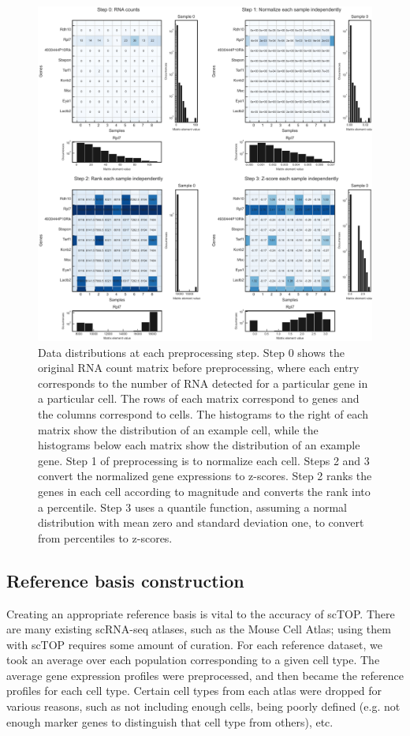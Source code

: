 \documentclass[aps,superscriptaddress, notitlepage,longbibliography]{revtex4-1}
\begin{document}
\begin{figure}
	\centering
		\includegraphics[scale=0.6]{figs/fig1a supplement.pdf}
	\caption{Data distributions at each preprocessing step. Step 0 shows the original RNA count matrix before preprocessing, where each entry corresponds to the number of RNA detected for a particular gene in a particular cell. The rows of each matrix correspond to genes and the columns correspond to cells. The histograms to the right of each matrix show the distribution of an example cell, while the histograms below each matrix show the distribution of an example gene. Step 1 of preprocessing is to normalize each cell. Steps 2 and 3 convert the normalized gene expressions to z-scores. Step 2 ranks the genes in each cell according to magnitude and converts the rank into a percentile. Step 3 uses a quantile function, assuming a normal distribution with mean zero and standard deviation one, to convert from percentiles to z-scores.}
	\label{FIG:supp1}
\end{figure}

\subsection{Reference basis construction}\label{basis construction}
Creating an appropriate reference basis is vital to the accuracy of scTOP. There are many existing scRNA-seq atlases, such as the Mouse Cell Atlas; using them with scTOP requires some amount of curation. For each reference dataset, we took an average over each population corresponding to a given cell type. The average gene expression profiles were preprocessed, and then became the reference profiles for each cell type. Certain cell types from each atlas were dropped for various reasons, such as not including enough cells, being poorly defined (e.g. not enough marker genes to distinguish that cell type from others), etc.
\end{document}
